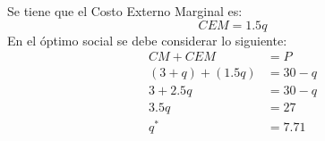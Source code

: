 Se tiene que el Costo Externo Marginal es:
	$$CEM = 1.5q$$
En el óptimo social se debe considerar lo siguiente:
	\begin{align*}
		CM + CEM &= P\\
		\left(3+q\right) + \left(1.5q\right) &= 30-q\\
		3 + 2.5q &= 30-q\\
		3.5q &= 27\\
		q^* &= 7.71
	\end{align*}